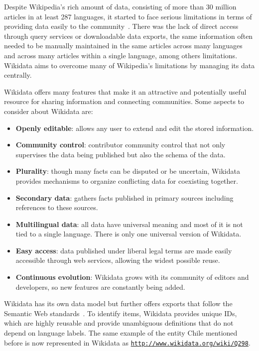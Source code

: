 Despite Wikipedia’s rich amount of data, consisting of more than 30 million articles in at least 
287 languages, it started to face serious limitations in terms of providing data easily to the 
community~\cite{KG:wikidata}. There was the lack of direct access through query services or 
downloadable data exports, the same information often needed to be manually maintained in the 
same articles across many languages and across many articles within a single language, among 
others limitations. Wikidata aims to overcome many of Wikipedia’s limitations by managing its 
data centrally.

Wikidata offers many features that make it an attractive and potentially useful resource for 
sharing information and connecting communities. Some aspects to consider about Wikidata are:

\begin{itemize}
    \item \textbf{Openly editable}: allows any user to extend and edit the stored information.
    \item \textbf{Community control}: contributor community control that not only supervises the 
    data being published but also the schema of the data. 
    \item \textbf{Plurality}: though many facts can be disputed or be uncertain, Wikidata provides 
    mechanisms to organize conflicting data for coexisting together.
    \item \textbf{Secondary data}: gathers facts published in primary sources including references 
    to these sources.
    \item \textbf{Multilingual data}: all data have universal meaning and most of it is not tied 
    to a single language. There is only one universal version of Wikidata.
    \item \textbf{Easy access}: data published under liberal legal terms are made  easily 
    accessible through web services, allowing the widest possible reuse.
    \item \textbf{Continuous evolution}: Wikidata grows with its community of editors and 
    developers, so new features are constantly being added.
\end{itemize}

Wikidata has its own data model but further offers exports that follow the Semantic Web 
standards~\cite{key:wikidataErxlebenGKMV14}. To identify items, Wikidata provides unique IDs, 
which are highly reusable and provide unambiguous definitions that do not depend on language 
labels. The same example of the entity Chile mentioned before is now represented in Wikidata as 
\texttt{\url{http://www.wikidata.org/wiki/Q298}}. 

